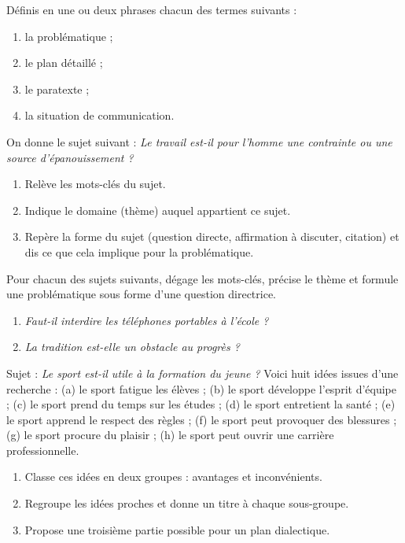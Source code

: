 \documentclass[11pt]{article}
\newcounter{popsec}
\newcounter{popsub}
\newcommand{\courssub}[1]{%
  \stepcounter{popsub}%
  \par\vspace{9pt}\noindent{\popxbold\fontsize{11.5}{13}\selectfont\color{popink}{\color{poporange}\thepopsec.\thepopsub}\hspace{6pt}#1}\par\nopagebreak\vspace{4pt}
}
\begin{document}
\begin{exercice}[Définitions]
Définis en une ou deux phrases chacun des termes suivants :
\begin{enumerate}
\item la problématique ;
\item le plan détaillé ;
\item le paratexte ;
\item la situation de communication.
\end{enumerate}
\end{exercice}

\begin{exercice}
On donne le sujet suivant : \emph{Le travail est-il pour l'homme une contrainte ou une source d'épanouissement ?}
\begin{enumerate}
\item Relève les mots-clés du sujet.
\item Indique le domaine (thème) auquel appartient ce sujet.
\item Repère la forme du sujet (question directe, affirmation à discuter, citation) et dis ce que cela implique pour la problématique.
\end{enumerate}
\end{exercice}

\courssub{Je m'entraîne}

\begin{exercice}
Pour chacun des sujets suivants, dégage les mots-clés, précise le thème et formule une problématique sous forme d'une question directrice.
\begin{enumerate}
\item \emph{Faut-il interdire les téléphones portables à l'école ?}
\item \emph{La tradition est-elle un obstacle au progrès ?}
\end{enumerate}
\end{exercice}

\begin{exercice}
Sujet : \emph{Le sport est-il utile à la formation du jeune ?} Voici huit idées issues d'une recherche : (a) le sport fatigue les élèves ; (b) le sport développe l'esprit d'équipe ; (c) le sport prend du temps sur les études ; (d) le sport entretient la santé ; (e) le sport apprend le respect des règles ; (f) le sport peut provoquer des blessures ; (g) le sport procure du plaisir ; (h) le sport peut ouvrir une carrière professionnelle.
\begin{enumerate}
\item Classe ces idées en deux groupes : avantages et inconvénients.
\item Regroupe les idées proches et donne un titre à chaque sous-groupe.
\item Propose une troisième partie possible pour un plan dialectique.
\end{enumerate}
\end{exercice}
\end{document}
